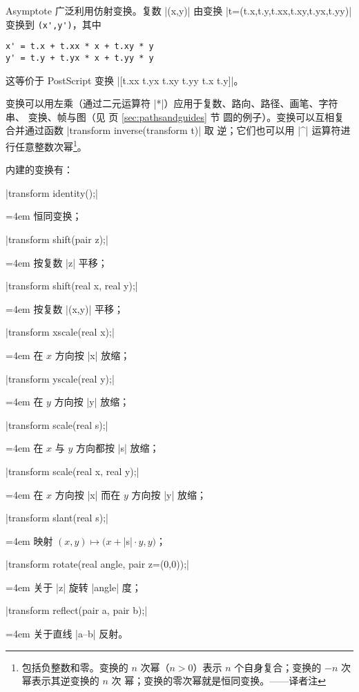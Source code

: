 \documentclass[nofonts,CJKnormalspaces]{ctexbook}[2009/05/20]
\newenvironment{funclist}{\trivlist
  \parindent=0pt
\item[]
  \def\item{\medskip\par\leftskip=0pt}
  \def\go{\par\leftskip=4em}}
{\endtrivlist}
\newcommand*\prgname[1]{\textsf{#1}}
\newcommand\transnote[1]{\footnote{#1——译者注}}
\begin{document}
\prgname{Asymptote} 广泛利用仿射变换。复数 |(x,y)| 由变换
|t=(t.x,t.y,t.xx,t.xy,t.yx,t.yy)| 变换到
\lstinline[stringstyle={\color{black}}]=(x',y')=，其中
\begin{lstlisting}[stringstyle={\color{black}}]
x' = t.x + t.xx * x + t.xy * y
y' = t.y + t.yx * x + t.yy * y
\end{lstlisting}
\lstset{}
这等价于 \prgname{PostScript} 变换 |[t.xx t.yx t.xy t.yy t.x t.y]|。

变换可以用左乘（通过二元运算符 |*|）应用于复数、路向、路径、画笔、字符串、
变换、帧与图（见 \pageref{sec:pathsandguides} 页 \ref{sec:pathsandguides} 节
圆的例子）。变换可以互相复合并通过函数 |transform inverse(transform t)| 取
逆；它们也可以用 |^| 运算符进行任意整数次幂\transnote{包括负整数和零。变换的
$n$ 次幂（$n>0$）表示 $n$ 个自身复合；变换的 $-n$ 次幂表示其逆变换的 $n$ 次
幂；变换的零次幂就是恒同变换。}。

内建的变换有：
\begin{funclist}
\item |transform identity();| \go
  恒同变换；

\item |transform shift(pair z);| \go
  按复数 |z| 平移；

\item |transform shift(real x, real y);| \go
  按复数 |(x,y)| 平移；

\item |transform xscale(real x);| \go
  在 $x$ 方向按 |x| 放缩；

\item |transform yscale(real y);| \go
  在 $y$ 方向按 |y| 放缩；

\item |transform scale(real s);| \go
  在 $x$ 与 $y$ 方向都按 |s| 放缩；

\item |transform scale(real x, real y);| \go
  在 $x$ 方向按 |x| 而在 $y$ 方向按 |y| 放缩；

\item |transform slant(real s);| \go
  映射 $(x,y) \mapsto (x+{}$|s|${}\cdot y, y)$；

\item |transform rotate(real angle, pair z=(0,0));| \go
  关于 |z| 旋转 |angle| 度；

\item |transform reflect(pair a, pair b);| \go
  关于直线 |a--b| 反射。
\end{funclist}
\end{document}

